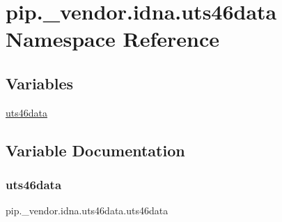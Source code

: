\hypertarget{namespacepip_1_1__vendor_1_1idna_1_1uts46data}{}\section{pip.\+\_\+vendor.\+idna.\+uts46data Namespace Reference}
\label{namespacepip_1_1__vendor_1_1idna_1_1uts46data}
\subsection*{Variables}
\begin{DoxyCompactItemize}
\item 
\hyperlink{namespacepip_1_1__vendor_1_1idna_1_1uts46data_a6530502bfb598ffa0cf7c123bb35b947}{uts46data}
\end{DoxyCompactItemize}


\subsection{Variable Documentation}
\mbox{\label{namespacepip_1_1__vendor_1_1idna_1_1uts46data_a6530502bfb598ffa0cf7c123bb35b947}} 
\subsubsection{\texorpdfstring{uts46data}{uts46data}}
{\footnotesize\ttfamily pip.\+\_\+vendor.\+idna.\+uts46data.\+uts46data}

